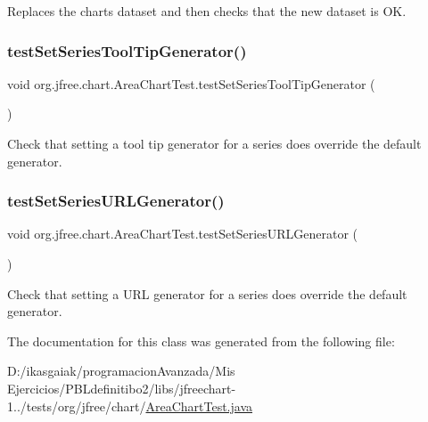 Replaces the chart\textquotesingle{}s dataset and then checks that the new dataset is OK. \mbox{\label{classorg_1_1jfree_1_1chart_1_1_area_chart_test_a58fb38858cd61c715aa32f40256145d2}} 
\subsubsection{\texorpdfstring{test\+Set\+Series\+Tool\+Tip\+Generator()}{testSetSeriesToolTipGenerator()}}
{\footnotesize\ttfamily void org.\+jfree.\+chart.\+Area\+Chart\+Test.\+test\+Set\+Series\+Tool\+Tip\+Generator (\begin{DoxyParamCaption}{ }\end{DoxyParamCaption})}

Check that setting a tool tip generator for a series does override the default generator. \mbox{\label{classorg_1_1jfree_1_1chart_1_1_area_chart_test_aef356d63fb34478e9106991c7653117f}} 
\subsubsection{\texorpdfstring{test\+Set\+Series\+U\+R\+L\+Generator()}{testSetSeriesURLGenerator()}}
{\footnotesize\ttfamily void org.\+jfree.\+chart.\+Area\+Chart\+Test.\+test\+Set\+Series\+U\+R\+L\+Generator (\begin{DoxyParamCaption}{ }\end{DoxyParamCaption})}

Check that setting a U\+RL generator for a series does override the default generator. 

The documentation for this class was generated from the following file\+:\begin{DoxyCompactItemize}
\item 
D\+:/ikasgaiak/programacion\+Avanzada/\+Mis Ejercicios/\+P\+B\+Ldefinitibo2/libs/jfreechart-\/1../tests/org/jfree/chart/\mbox{\hyperlink{_area_chart_test_8java}{Area\+Chart\+Test.\+java}}\end{DoxyCompactItemize}
